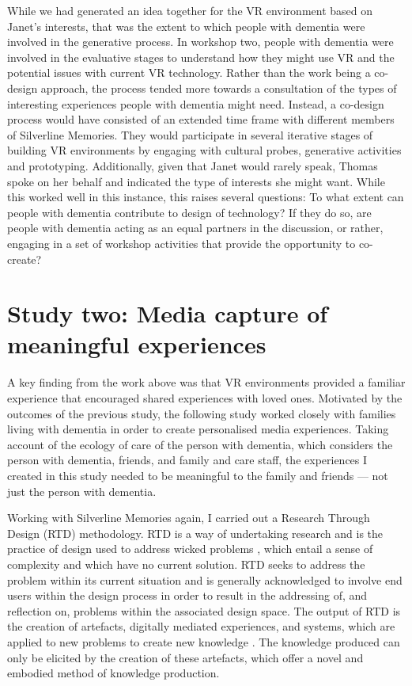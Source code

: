 While we had generated an idea together for the VR environment based on Janet's interests, that was the extent to which people with dementia were involved in the generative process. In workshop two, people with dementia were involved in the evaluative stages to understand how they might use VR and the potential issues with current VR technology. Rather than the work being  a co-design approach, the process tended more towards a consultation of the types of interesting experiences people with dementia might need. Instead, a co-design process would have consisted of an extended time frame with different members of Silverline Memories. They would participate in several iterative stages of building VR environments by engaging with cultural probes, generative activities and prototyping. Additionally, given that Janet would rarely speak, Thomas spoke on her behalf and indicated the type of interests she might want. While this worked well in this instance, this raises several questions: To what extent can people with dementia contribute to design of technology? If they do so, are people with dementia acting as an equal partners in the discussion, or rather, engaging in a set of workshop activities that provide the opportunity to co-create? \citep{tsekleves2020engaging,lindsay_empathy_2012}

\section{Study two: Media capture of meaningful experiences}
\label{studyTwo}
A key finding from the work above was that VR environments provided a familiar experience that encouraged shared experiences with loved ones. Motivated by the outcomes of the previous study, the following study worked closely with families living with dementia in order to create personalised media experiences. Taking account of the ecology of care of the person with dementia, which considers the person with dementia, friends, and family and care staff, the experiences I created in this study needed to be meaningful to the family and friends — not just the person with dementia. 

Working with Silverline Memories again, I carried out a Research Through Design (RTD) methodology. RTD is a way of undertaking research and is the practice of design used to address wicked problems \citep{zimmerman_research_2007}, which entail a sense of complexity and which have no current solution. RTD seeks to address the problem within its current situation and is generally acknowledged to involve end users within the design process in order to result in the addressing of, and reflection on, problems within the associated design space. The output of RTD is the creation of artefacts, digitally mediated experiences, and systems, which are applied to new problems to create new knowledge \citep{gaver_what_2012,bardzell_documenting_2016}. The knowledge produced can only be elicited by the creation of these artefacts, which offer a novel and embodied method of knowledge production.

